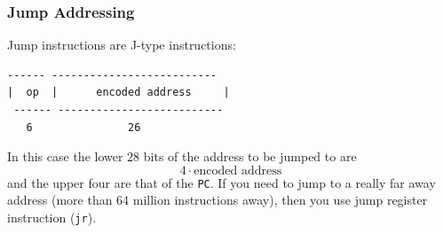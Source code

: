 \documentclass[10pt]{article}
\begin{document}
\subsubsection{Jump Addressing}
Jump instructions are J-type instructions:
\begin{lstlisting}[style=CStyle, numbers=none, xleftmargin=5.0ex, aboveskip=1em, belowskip=1em, numberstyle=\color{blue}, escapeinside=..]
 ------ --------------------------
|  op  |      encoded address     |
 ------ --------------------------
   6               26
\end{lstlisting}
In this case the lower $28$ bits of the address to be jumped to are
\[4 \cdot \text{encoded address}\]
and the upper four are that of the \texttt{PC}.  If you need to jump to a really far away address (more than 64 million instructions away), then you use jump register instruction (\texttt{jr}).
\end{document}
